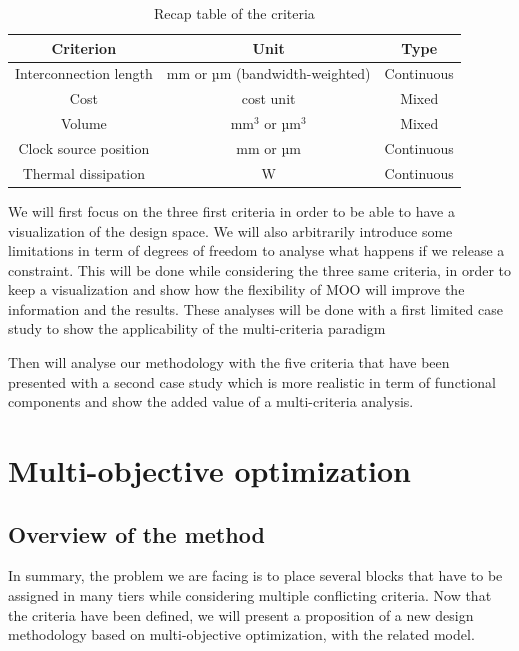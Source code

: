 \begin{table}
\caption{Recap table of the criteria}
\begin{center}
\begin{tabular}{|c|c|c|}
\hline
Criterion & Unit & Type\\
\hline
Interconnection length & mm or µm (bandwidth-weighted) & Continuous\\
Cost & cost unit & Mixed\\
Volume & mm$^3$ or µm$^3$ & Mixed\\
Clock source position & mm or µm & Continuous\\
Thermal dissipation & W & Continuous\\
\hline
\end{tabular}
\end{center}
\label{tab:critrecap}
\end{table}

We will first focus on the three first criteria in order to be able to have a visualization of the design space. We will also arbitrarily introduce some limitations in term of degrees of freedom to analyse what happens if we release a constraint. This will be done while considering the three same criteria, in order to keep a visualization and show how the flexibility of MOO will improve the information and the results. These analyses will be done with a first limited case study to show the applicability of the multi-criteria paradigm

Then will analyse our methodology with the five criteria that have been presented with a second case study which is more realistic in term of functional components and show the added value of a multi-criteria analysis.

\section{Multi-objective optimization}

\subsection{Overview of the method}
In summary, the problem we are facing is to place several blocks that have to be assigned in many tiers while considering multiple conflicting criteria. Now that the criteria have been defined, we will present a proposition of a new design methodology based on multi-objective optimization, with the related model.

